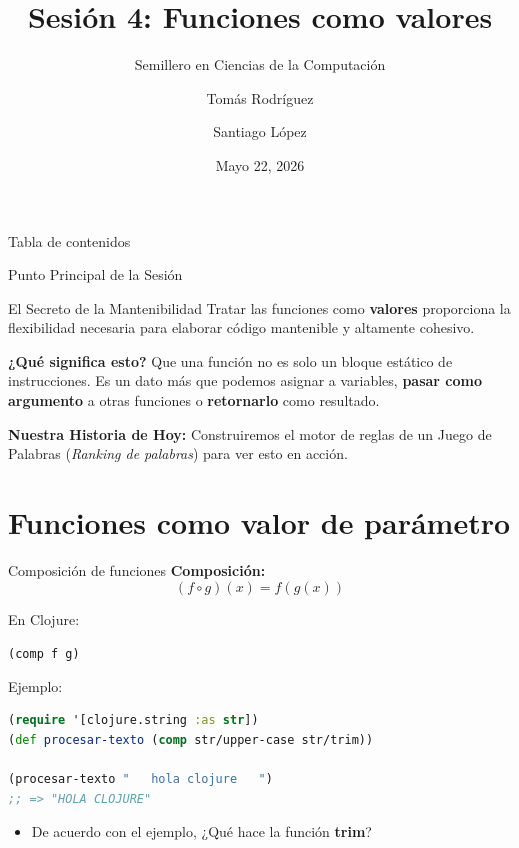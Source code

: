 \documentclass{beamer}
\title{Sesión 4: Funciones como valores}
\subtitle{Semillero en Ciencias de la Computación}
\author[Rodríguez, López]{Tomás Rodríguez \and Santiago López}
\date{Mayo 22, 2026}
\begin{document}
\frame{\titlepage}

\begin{frame}{Tabla de contenidos}
    \tableofcontents    
\end{frame}

\begin{frame}{Punto Principal de la Sesión}
    \begin{block}{El Secreto de la Mantenibilidad}
        Tratar las funciones como \textbf{valores} proporciona la flexibilidad necesaria para elaborar código mantenible y altamente cohesivo.
    \end{block}
    
    \vspace{0.3cm}
    \textbf{¿Qué significa esto?}
    Que una función no es solo un bloque estático de instrucciones. Es un dato más que podemos asignar a variables, \textbf{pasar como argumento} a otras funciones o \textbf{retornarlo} como resultado.
    
    \vspace{0.3cm}
    \textbf{Nuestra Historia de Hoy:} Construiremos el motor de reglas de un Juego de Palabras (\textit{Ranking de palabras}) para ver esto en acción.
\end{frame}

\section{Funciones como valor de parámetro}

\begin{frame}[fragile]{Composición de funciones}
    \textbf{Composición:}
    $$
        (f \circ g )( x) =f(g(x))
    $$
    
    
    \vspace{0.3cm}
    En Clojure:
    \begin{center}
        \texttt{(comp f g)}
    \end{center}
    
    Ejemplo:

    \begin{lstlisting}[language=Clojure]
(require '[clojure.string :as str])
(def procesar-texto (comp str/upper-case str/trim))

(procesar-texto "   hola clojure   ")
;; => "HOLA CLOJURE"
    \end{lstlisting}

    \begin{itemize}
        \item De acuerdo con el ejemplo, ¿Qué hace la función \textbf{trim}?
    \end{itemize}
    
\end{frame}
\end{document}
